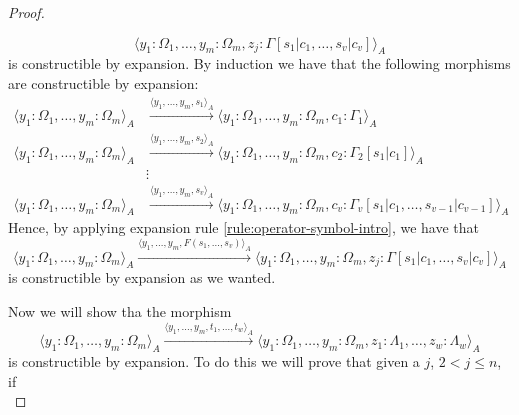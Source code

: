 \begin{proof}
\begin{itemize}
\begin{equation*}
                \langle y_1 : \Omega_1, \dots, y_m : \Omega_m, z_j : \Gamma[s_1 | c_1, \dots, s_v | c_v] \rangle_A
            \end{equation*}
            is constructible by expansion.
            By induction we have that the following morphisms are
            constructible by expansion:
            \begin{align*} %
                \langle y_1 : \Omega_1, \dots, y_m : \Omega_m \rangle_A
                &\xrightarrow{\langle y_1, \dots, y_m, s_1 \rangle_A}
                \langle y_1 : \Omega_1, \dots, y_m : \Omega_m, c_1 : \Gamma_1 \rangle_A \\ 
                \langle y_1 : \Omega_1, \dots, y_m : \Omega_m \rangle_A
                &\xrightarrow{\langle y_1, \dots, y_m, s_2 \rangle_A}
                \langle y_1 : \Omega_1, \dots, y_m : \Omega_m, c_2 : \Gamma_2[s_1 | c_1] \rangle_A \\
                &\vdots \\
                \langle y_1 : \Omega_1, \dots, y_m : \Omega_m \rangle_A
                &\xrightarrow{\langle y_1, \dots, y_m, s_v \rangle_A}
                \langle y_1 : \Omega_1, \dots, y_m : \Omega_m, c_v : \Gamma_v[s_1 | c_1, \dots, s_{v-1} | c_{v-1} ] \rangle_A
            \end{align*}
            Hence, by applying expansion rule \ref{rule:operator-symbol-intro}, we have that 
            \begin{equation*} %
                \langle y_1 : \Omega_1, \dots, y_m : \Omega_m \rangle_A
                \xrightarrow{\langle y_1, \dots, y_m, F(s_1, \dots, s_v) \rangle_A}
                \langle y_1 : \Omega_1, \dots, y_m : \Omega_m, z_j : \Gamma[s_1 | c_1, \dots, s_v | c_v] \rangle_A
            \end{equation*}
            is constructible by expansion as we wanted.
    \end{itemize}
    Now we will show tha the morphism 
    \begin{equation*} %
        \langle y_1 : \Omega_1, \dots, y_m : \Omega_m \rangle_A
        \xrightarrow{\langle y_1, \dots, y_m, t_1, \dots, t_w \rangle_A}
        \langle y_1 : \Omega_1, \dots, y_m : \Omega_m, z_1 : \Lambda_1, \dots, z_w : \Lambda_w \rangle_A
    \end{equation*}
    is constructible by expansion. To do this we will prove that given a $j$, $2 < j \leq n$, if
    \begin{equation*} %

\end{equation*}
\end{proof}
